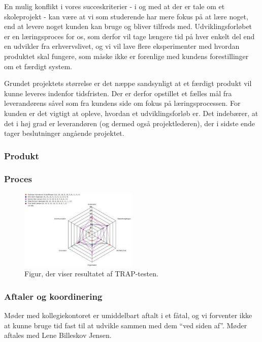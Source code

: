 \documentclass[12pt, a4paper]{report}
\begin{document}
En mulig konflikt i vores succeskriterier - i og med at der er tale om et skoleprojekt - kan være at vi som studerende har mere fokus på at lære noget, end at levere noget kunden kan bruge og bliver tilfreds med. Udviklingsforløbet er en læringsproces for os, som derfor vil tage længere tid på hver enkelt del end en udvikler fra erhvervslivet, og vi vil lave flere eksperimenter med hvordan produktet skal fungere, som måske ikke er forenlige med kundens forestillinger om et færdigt system.

Grundet projektets størrelse er det næppe sandsynligt at et færdigt produkt vil kunne leveres indenfor tidsfristen. Der er derfor opstillet et fælles mål fra leverandørens såvel som fra kundens side om fokus på læringsprocessen. For kunden er det vigtigt at opleve, hvordan et udviklingsforløb er. Det indebærer, at det i høj grad er leverandøren (og dermed også projektlederen), der i sidste ende tager beslutninger angående projektet.


\subsubsection{Produkt}

\subsubsection{Proces}

\begin{figure}[h!]
\includegraphics[width=0.5\textwidth]{itsaTRAP}
\caption{Figur, der viser resultatet af TRAP-testen.}
\label{trap}
\end{figure}

\subsubsection{Aftaler og koordinering}
Møder med kollegiekontoret er umiddelbart aftalt i et fåtal, og vi forventer ikke at kunne bruge tid fast til at udvikle sammen med dem “ved siden af”. Møder aftales med Lene Billeskov Jensen.
\end{document}
